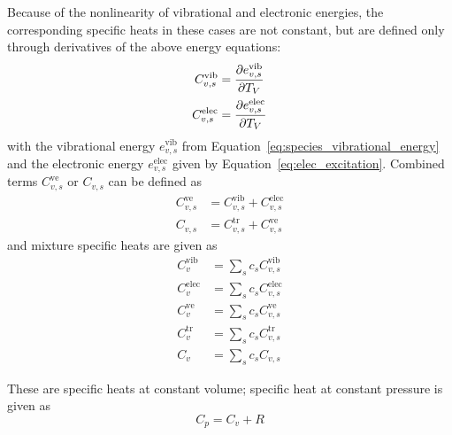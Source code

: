 Because of the nonlinearity of vibrational and electronic energies,
the corresponding specific heats in these cases are not constant, but
are defined only through derivatives of the above energy equations:
\begin{align}
C^{\text{vib}}_{v,s} &= {\frac{\partial{e^{\text{vib}}_{v,s}}}{\partial{T_V}}} \\
C^{\text{elec}}_{v,s} &= {\frac{\partial{e^{\text{elec}}_{v,s}}}{\partial{T_V}}}
\end{align}
with the vibrational energy $e^{\text{vib}}_{v,s}$ from
Equation~\eqref{eq:species_vibrational_energy} and the 
electronic energy $e^{\text{elec}}_{v,s}$ given by
Equation~\eqref{eq:elec_excitation}.
%
Combined terms $C^{\text{ve}}_{v,s}$ or $C_{v,s}$ can be defined as
\begin{align}
  C^{\text{ve}}_{v,s} &= C^{\text{vib}}_{v,s} + C^{\text{elec}}_{v,s} \\
  C_{v,s} &= C^{\text{tr}}_{v,s} + C^{\text{ve}}_{v,s}
\end{align}
%
and mixture specific heats are given as
\begin{align}
  C^{\text{vib}}_{v} &= \sum_s c_s
    C^{\text{vib}}_{v,s} \\
  C^{\text{elec}}_{v} &= \sum_s c_s
    C^{\text{elec}}_{v,s} \\
  C^{\text{ve}}_{v} &=  \sum_s c_s
    C^{\text{ve}}_{v,s} \\
  C^{\text{tr}}_{v} &= \sum_s c_s
    C^{\text{tr}}_{v,s} \\
  C_{v} &= \sum_s c_s
    C_{v,s}
\end{align}

These are specific heats at constant volume; specific heat at constant
pressure is given as
\begin{equation}
C_p = C_v + R
\end{equation}

